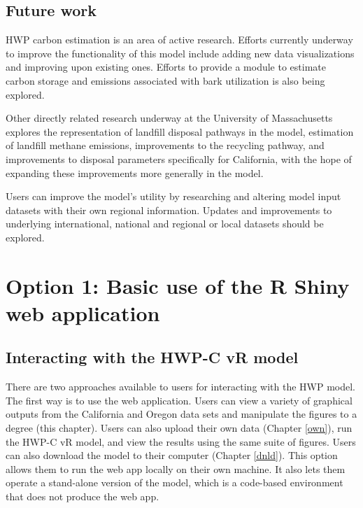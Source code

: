 \documentclass[
  openany]{book}
\begin{document}
\hypertarget{int-future}{%
\section{Future work}\label{int-future}}

HWP carbon estimation is an area of active research. Efforts currently underway to improve the functionality of this model include adding new data visualizations and improving upon existing ones. Efforts to provide a module to estimate carbon storage and emissions associated with bark utilization is also being explored.

Other directly related research underway at the University of Massachusetts explores the representation of landfill disposal pathways in the model, estimation of landfill methane emissions, improvements to the recycling pathway, and improvements to disposal parameters specifically for California, with the hope of expanding these improvements more generally in the model.

Users can improve the model's utility by researching and altering model input datasets with their own regional information. Updates and improvements to underlying international, national and regional or local datasets should be explored.

\hypertarget{app}{%
\chapter{Option 1: Basic use of the R Shiny web application}\label{app}}

\hypertarget{app-sum}{%
\section{Interacting with the HWP-C vR model}\label{app-sum}}

There are two approaches available to users for interacting with the HWP model. The first way is to use the web application. Users can view a variety of graphical outputs from the California and Oregon data sets and manipulate the figures to a degree (this chapter). Users can also upload their own data (Chapter \ref{own}), run the HWP-C vR model, and view the results using the same suite of figures. Users can also download the model to their computer (Chapter \ref{dnld}). This option allows them to run the web app locally on their own machine. It also lets them operate a stand-alone version of the model, which is a code-based environment that does not produce the web app.
\end{document}
